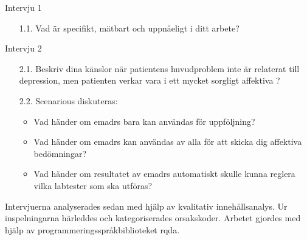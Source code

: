 \documentclass[12pt,a4paper,oneside]{article}
\let\oldcite\cite
\renewcommand*\cite[1]{\textsuperscript{\oldcite{#1}}}
\begin{document}
Intervju 1%
\begin{itemize}
\item [1.1.]{\bf} Vad {\"a}r specifikt, m{\"a}tbart och uppn{\aa}eligt i ditt arbete?
\end{itemize}
Intervju 2%
\begin{itemize}%
\item[2.1.] {\bf} Beskriv dina k{\"a}nslor n{\"a}r patientens huvudproblem inte {\"a}r relaterat till depression, men patienten verkar vara i ett mycket sorgligt affektiva ?
\item[2.2.] {\bf} Scenarious diskuteras:
\begin{itemize}\vspace{-.5em}
\item {\bf} Vad h{\"a}nder om e{\sc madrs} bara kan anv{\"a}ndas f{\"or} uppf{\"o}ljning?
\item {\bf} Vad h{\"a}nder om e{\sc madrs} kan anv{\"a}ndas av alla f{\"o}r att skicka dig affektiva bed{\"o}mningar?
\item {\bf} Vad h{\"a}nder om resultatet av e{\sc madrs} automatiskt skulle kunna reglera vilka labtester som ska utf{\"o}ras?
\end{itemize}
\end{itemize}
Intervjuerna analyserades sedan med hj{\"a}lp av kvalitativ inneh{\aa}llsanalys\cite{analysis1}. Ur inspelningarna h{\"a}rleddes och kategoriserades orsakskoder. Arbetet gjordes med hj{\"a}lp av programmeringsspr{\aa}kbiblioteket {\sc rqda}\cite{rqda}.
\end{document}
